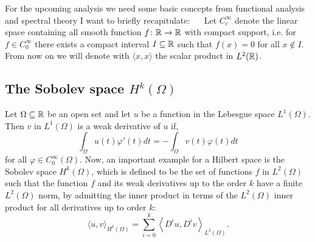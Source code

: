 For the upcoming analysis we need some basic concepts from functional analysis and spectral theory I want to briefly recapitulate:
~\newline ~\newline
Let $C_{c}^{\infty}$ denote the linear space containing all smooth function $f \colon \mathbb{R} \rightarrow \mathbb{R}$ with compact support, i.e. for $f \in C_{0}^{\infty}$ there exists a compact interval $I \subseteq \mathbb{R}$ such that $f(x) = 0$ for all $x \notin I$. From now on we will denote with $\langle x, x \rangle$ the scalar product in $L^{2}(\mathbb{R})$.
\subsection*{The Sobolev space $H^{k}(\Omega)$}
Let $\Omega \subseteq \mathbb{R}$ be an open set and let $u$ be a function in the Lebesgue space $L^{1}(\Omega)$. Then $v$ in $L^{1}(\Omega)$ is a weak derivative of $u$ if, 
	\[ \int_{\Omega} u(t)\varphi'(t) dt = -\int_{\Omega} v(t) \varphi(t) dt \]
for all $\varphi \in C_{0}^{\infty}(\Omega)$. Now, an important example for a Hilbert space is the Sobolev space $H^{k}(\Omega)$, which is defined to be the set of functions $f$ in $L^{2}(\Omega)$ such that the function $f$ and its weak derivatives up to the order $k$ have a finite $L^{2}(\Omega)$ norm, by admitting the inner product in terms of the $L^{2}(\Omega)$ inner product for all derivatives up to order $k$: 
	\[ \langle u , v \rangle_{H^{k}(\Omega)} = \sum_{i=0}^{k} \left\langle D^{i}u , D^{i} v \right\rangle_{L^{2}(\Omega)}. \] 	
